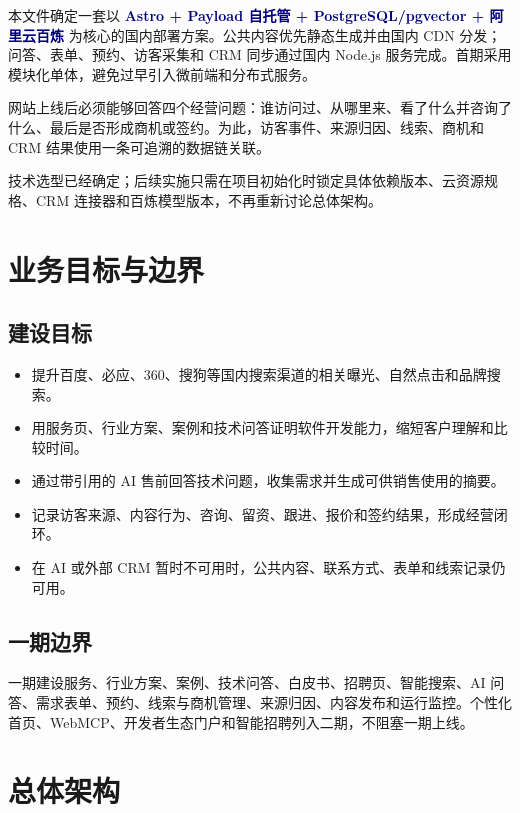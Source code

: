 \documentclass[UTF8,zihao=-4,a4paper]{ctexart}
\newcommand{\term}[1]{\textbf{\textcolor{navy}{#1}}}
\begin{document}
本文件确定一套以 \term{Astro + Payload 自托管 + PostgreSQL/pgvector + 阿里云百炼} 为核心的国内部署方案。公共内容优先静态生成并由国内 CDN 分发；问答、表单、预约、访客采集和 CRM 同步通过国内 Node.js 服务完成。首期采用模块化单体，避免过早引入微前端和分布式服务。

网站上线后必须能够回答四个经营问题：谁访问过、从哪里来、看了什么并咨询了什么、最后是否形成商机或签约。为此，访客事件、来源归因、线索、商机和 CRM 结果使用一条可追溯的数据链关联。

\begin{tcolorbox}[colback=sky,colframe=teal!55!black,boxrule=0.6pt,arc=1mm,title=\textbf{核心结论}]
技术选型已经确定；后续实施只需在项目初始化时锁定具体依赖版本、云资源规格、CRM 连接器和百炼模型版本，不再重新讨论总体架构。
\end{tcolorbox}

\section{业务目标与边界}

\subsection{建设目标}
\begin{itemize}
  \item 提升百度、必应、360、搜狗等国内搜索渠道的相关曝光、自然点击和品牌搜索。
  \item 用服务页、行业方案、案例和技术问答证明软件开发能力，缩短客户理解和比较时间。
  \item 通过带引用的 AI 售前回答技术问题，收集需求并生成可供销售使用的摘要。
  \item 记录访客来源、内容行为、咨询、留资、跟进、报价和签约结果，形成经营闭环。
  \item 在 AI 或外部 CRM 暂时不可用时，公共内容、联系方式、表单和线索记录仍可用。
\end{itemize}

\subsection{一期边界}
一期建设服务、行业方案、案例、技术问答、白皮书、招聘页、智能搜索、AI 问答、需求表单、预约、线索与商机管理、来源归因、内容发布和运行监控。个性化首页、WebMCP、开发者生态门户和智能招聘列入二期，不阻塞一期上线。

\section{总体架构}
\end{document}
